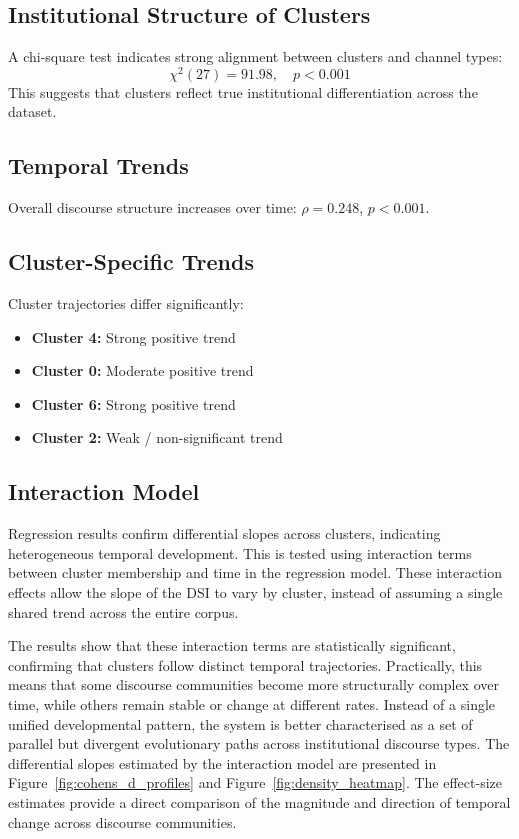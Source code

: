 \documentclass[11pt]{article}
\begin{document}
\subsection{Institutional Structure of Clusters}
A chi-square test indicates strong alignment between clusters and channel types:
\begin{equation}
    \chi^2(27) = 91.98, \quad p < 0.001
\end{equation}
This suggests that clusters reflect true institutional differentiation across the dataset.

\subsection{Temporal Trends}
Overall discourse structure increases over time: $\rho = 0.248$, $p < 0.001$.

\subsection{Cluster-Specific Trends}
Cluster trajectories differ significantly:
\begin{itemize}
    \item \textbf{Cluster 4:} Strong positive trend
    \item \textbf{Cluster 0:} Moderate positive trend
    \item \textbf{Cluster 6:} Strong positive trend
    \item \textbf{Cluster 2:} Weak / non-significant trend
\end{itemize}

\subsection{Interaction Model}
Regression results confirm differential slopes across clusters, indicating heterogeneous temporal development. This is tested using interaction terms between cluster membership and time in the regression model. These interaction effects allow the slope of the DSI to vary by cluster, instead of assuming a single shared trend across the entire corpus. 

The results show that these interaction terms are statistically significant, confirming that clusters follow distinct temporal trajectories. Practically, this means that some discourse communities become more structurally complex over time, while others remain stable or change at different rates. Instead of a single unified developmental pattern, the system is better characterised as a set of parallel but divergent evolutionary paths across institutional discourse types. The differential slopes estimated by the interaction model are presented in Figure~\ref{fig:cohens_d_profiles} and Figure~\ref{fig:density_heatmap}. The effect-size estimates provide a direct comparison of the magnitude and direction of temporal change across discourse communities.
\end{document}

